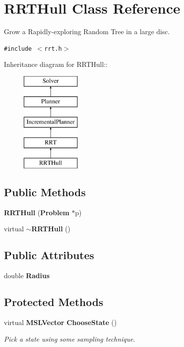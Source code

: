 \section{RRTHull  Class Reference}
\label{classRRTHull}
Grow a Rapidly-exploring Random Tree in a large disc. 


{\tt \#include $<$rrt.h$>$}

Inheritance diagram for RRTHull::\begin{figure}[H]
\begin{center}
\leavevmode
\includegraphics[height=5cm]{classRRTHull}
\end{center}
\end{figure}
\subsection*{Public Methods}
\begin{CompactItemize}
\item 
{\bf RRTHull} ({\bf Problem} $\ast$p)
\item 
virtual {\bf $\sim$RRTHull} ()
\end{CompactItemize}
\subsection*{Public Attributes}
\begin{CompactItemize}
\item 
double {\bf Radius}
\end{CompactItemize}
\subsection*{Protected Methods}
\begin{CompactItemize}
\item 
virtual {\bf MSLVector} {\bf Choose\-State} ()
\begin{CompactList}\small\item\em Pick a state using some sampling technique.\item\end{CompactList}\end{CompactItemize}


